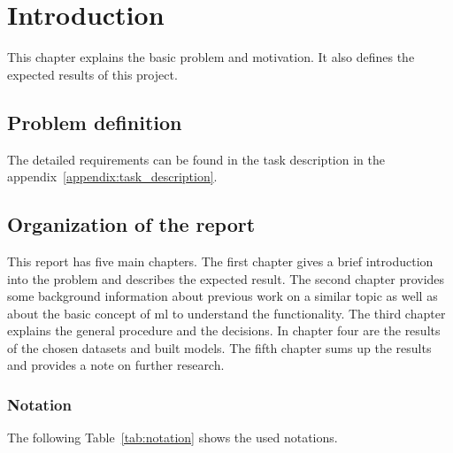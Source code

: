 \chapter{Introduction}
This chapter explains the basic problem and motivation. It also defines the expected results of this project.

\section{Problem definition}



The detailed requirements can be found in the task description in the appendix~\ref{appendix:task_description}.

\newpage

\section{Organization of the report}
This report has five main chapters. The first chapter gives a brief introduction into the problem and describes the expected result. The second chapter provides some background information about previous work on a similar topic as well as about the basic concept of \gls{ml} to understand the functionality. The third chapter explains the general procedure and the decisions. In chapter four are the results of the chosen datasets and built models. The fifth chapter sums up the results and provides a note on further research. %

\subsection{Notation}
The following Table~\ref{tab:notation} shows the used notations.

